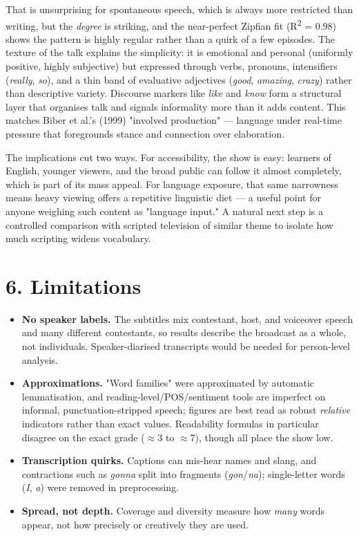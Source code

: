 \documentclass[11pt]{article}
\begin{document}
That is unsurprising for spontaneous speech, which is always more restricted than writing, but the \emph{degree} is striking, and the near-perfect Zipfian fit (R\textsuperscript{2} = 0.98) shows the pattern is highly regular rather than a quirk of a few episodes. The texture of the talk explains the simplicity: it is emotional and personal (uniformly positive, highly subjective) but expressed through verbs, pronouns, intensifiers (\emph{really}, \emph{so}), and a thin band of evaluative adjectives (\emph{good}, \emph{amazing}, \emph{crazy}) rather than descriptive variety. Discourse markers like \emph{like} and \emph{know} form a structural layer that organises talk and signals informality more than it adds content. This matches Biber et al.'s (1999) "involved production" --- language under real-time pressure that foregrounds stance and connection over elaboration.

The implications cut two ways. For accessibility, the show is easy: learners of English, younger viewers, and the broad public can follow it almost completely, which is part of its mass appeal. For language exposure, that same narrowness means heavy viewing offers a repetitive linguistic diet --- a useful point for anyone weighing such content as "language input." A natural next step is a controlled comparison with scripted television of similar theme to isolate how much scripting widens vocabulary.


\section*{6. Limitations}

\begin{itemize}
\item \textbf{No speaker labels.} The subtitles mix contestant, host, and voiceover speech and many different contestants, so results describe the broadcast as a whole, not individuals. Speaker-diarised transcripts would be needed for person-level analysis.
\item \textbf{Approximations.} "Word families" were approximated by automatic lemmatisation, and reading-level/POS/sentiment tools are imperfect on informal, punctuation-stripped speech; figures are best read as robust \emph{relative} indicators rather than exact values. Readability formulas in particular disagree on the exact grade ($\approx$3 to $\approx$7), though all place the show low.
\item \textbf{Transcription quirks.} Captions can mis-hear names and slang, and contractions such as \emph{gonna} split into fragments (\emph{gon}/\emph{na}); single-letter words (\emph{I}, \emph{a}) were removed in preprocessing.
\item \textbf{Spread, not depth.} Coverage and diversity measure how \emph{many} words appear, not how precisely or creatively they are used.
\end{itemize}
\end{document}
